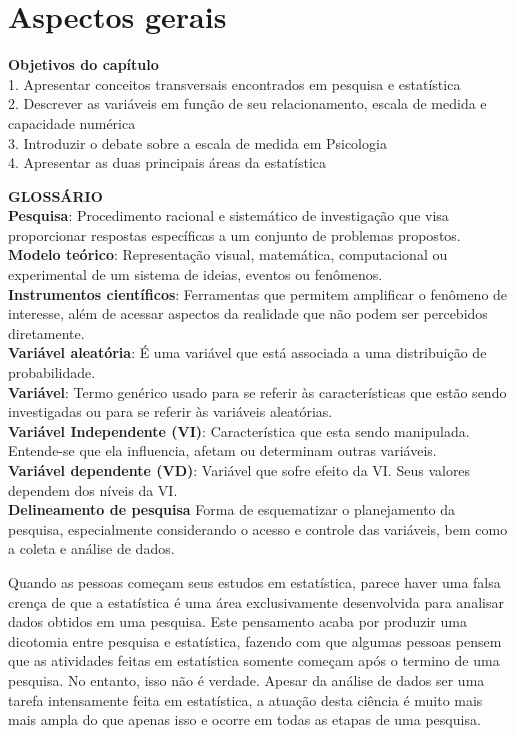 \documentclass[
]{book}
\begin{document}
\hypertarget{aspectos-gerais}{%
\chapter{Aspectos gerais}\label{aspectos-gerais}}

\begin{objectives}
\textbf{Objetivos do capítulo}\\
1. Apresentar conceitos transversais encontrados em pesquisa e
estatística\\
2. Descrever as variáveis em função de seu relacionamento, escala de
medida e capacidade numérica\\
3. Introduzir o debate sobre a escala de medida em Psicologia\\
4. Apresentar as duas principais áreas da estatística
\end{objectives}

\begin{glossario}
\textbf{GLOSSÁRIO}\\
\textbf{Pesquisa}: Procedimento racional e sistemático de investigação
que visa proporcionar respostas específicas a um conjunto de problemas
propostos.\\
\textbf{Modelo teórico}: Representação visual, matemática, computacional
ou experimental de um sistema de ideias, eventos ou fenômenos.\\
\textbf{Instrumentos científicos}: Ferramentas que permitem amplificar o
fenômeno de interesse, além de acessar aspectos da realidade que não
podem ser percebidos diretamente.\\
\textbf{Variável aleatória}: É uma variável que está associada a uma
distribuição de probabilidade.\\
\textbf{Variável}: Termo genérico usado para se referir às
características que estão sendo investigadas ou para se referir às
variáveis aleatórias.\\
\textbf{Variável Independente (VI)}: Característica que esta sendo
manipulada. Entende-se que ela influencia, afetam ou determinam outras
variáveis.\\
\textbf{Variável dependente (VD)}: Variável que sofre efeito da VI. Seus
valores dependem dos níveis da VI.\\
\textbf{Delineamento de pesquisa} Forma de esquematizar o planejamento
da pesquisa, especialmente considerando o acesso e controle das
variáveis, bem como a coleta e análise de dados.
\end{glossario}

Quando as pessoas começam seus estudos em estatística, parece haver uma falsa crença de que a estatística é uma área exclusivamente desenvolvida para analisar dados obtidos em uma pesquisa. Este pensamento acaba por produzir uma dicotomia entre pesquisa e estatística, fazendo com que algumas pessoas pensem que as atividades feitas em estatística somente começam após o termino de uma pesquisa. No entanto, isso não é verdade. Apesar da análise de dados ser uma tarefa intensamente feita em estatística, a atuação desta ciência é muito mais mais ampla do que apenas isso e ocorre em todas as etapas de uma pesquisa.
\end{document}
